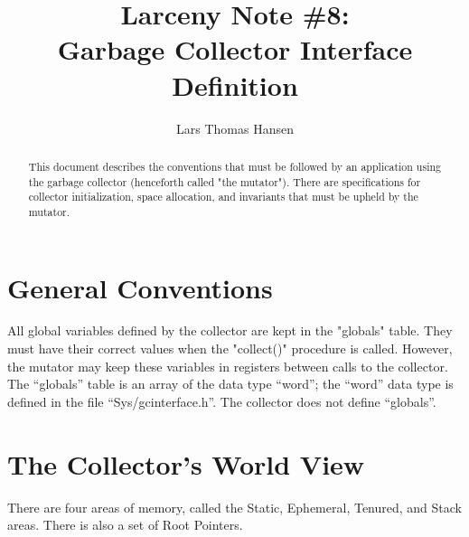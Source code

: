 

\title{Larceny Note \#8: \\
       Garbage Collector Interface Definition}
\author{Lars Thomas Hansen}


\maketitle

\begin{abstract}
This document describes the conventions that must be followed by an
application using the garbage collector (henceforth called "the mutator").
There are specifications for collector initialization, space allocation, and
invariants that must be upheld by the mutator. 
\end{abstract}


\section{General Conventions}

All global variables defined by the collector are kept in the "globals"
table. They must have their correct values when the "collect()" procedure is
called.  However, the mutator may keep these variables in registers between
calls to the collector.  The ``globals'' table is an array of the data type
``word''; the ``word'' data type is defined in the file ``Sys/gcinterface.h''.
The collector does not define ``globals''.

\section{The Collector's World View}

There are four areas of memory, called the Static, Ephemeral, Tenured, and
Stack areas. There is also a set of Root Pointers.

